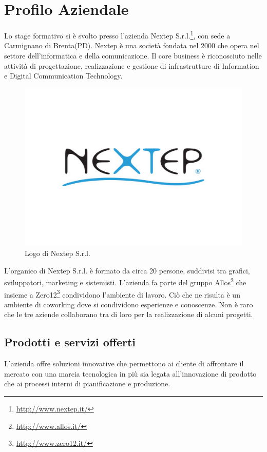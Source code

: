 
\chapter{Profilo Aziendale}
\label{cap:introduzione}

Lo stage formativo si è svolto presso l'azienda Nextep S.r.l.\footnote{\url{http://www.nextep.it/}}, con sede a Carmignano di Brenta(PD). Nextep è una società fondata nel 2000 che opera nel settore dell'informatica e della comunicazione. Il core business è riconosciuto nelle attività di progettazione, realizzazione e gestione di infrastrutture di Information e Digital Communication Technology.

\begin{figure}[h]
\centering
\includegraphics[width=0.5\linewidth]{immagini/logo-nextep}
\caption[Logo di Nextep S.r.l.]{Logo di Nextep S.r.l.}
\label{fig:logo-nextep}
\end{figure}

L'organico di Nextep S.r.l. è formato da circa 20 persone, suddivisi tra grafici, sviluppatori, marketing e sistemisti. L'azienda fa parte del gruppo Allos\footnote{\url{http://www.allos.it/}} che insieme a Zero12\footnote{\url{http://www.zero12.it/}} condividono l'ambiente di lavoro. Ciò che ne risulta è un ambiente di coworking dove si condividono esperienze e conoscenze. Non è raro che le tre aziende collaborano tra di loro per la realizzazione di alcuni progetti.


\section{Prodotti e servizi offerti}

L'azienda offre soluzioni innovative che permettono ai cliente di affrontare il mercato con una marcia tecnologica in più sia legata all'innovazione di prodotto che ai processi interni di pianificazione e produzione.

